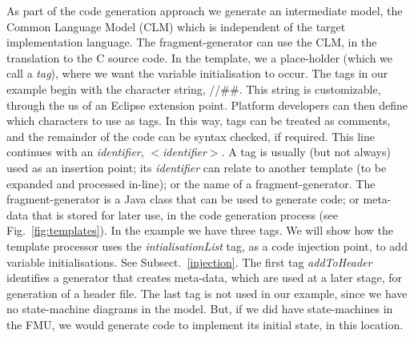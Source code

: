 \documentclass{llncs}%
\begin{document}
As part of the code generation approach we generate an intermediate model, the Common Language Model (CLM) which is independent of the target implementation language. The fragment-generator can use the CLM, in the translation to the C source code.  In the template, we a place-holder (which we call a \emph{tag}), where we want the variable initialisation to occur. The tags in our example begin with the character string, //\#\#.  This string is customizable, through the us of an Eclipse extension point. Platform developers can then define which characters to use as tags. In this way, tags can be treated as comments, and the remainder of the code can be syntax checked, if required. This line continues with an \emph{identifier}, $<$\emph{identifier}$>$. A tag is usually (but not always) used as an insertion point; its \emph{identifier} can relate to another template (to be expanded and processed in-line); or the name of a fragment-generator. The fragment-generator is a Java class that can be used to generate code; or meta-data that is stored for later use, in the code generation process  (see Fig.~\ref{fig:templates}). In the example we have three tags. We will show how the template processor uses the \emph{intialisationList} tag, as a code injection point, to add variable initialisations. See Subsect.~\ref{injection}. The first tag \emph{addToHeader} identifies a generator that creates meta-data, which are used at a later stage, for generation of a header file. The last tag is not used in our example, since we have no state-machine diagrams in the model. But, if we did have state-machines in the FMU, we would generate code to implement its initial state, in this location.
%
\end{document}
